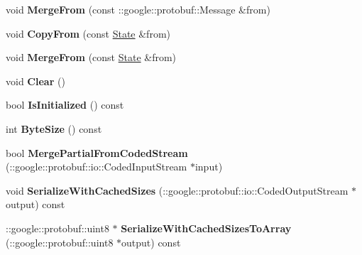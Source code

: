 \begin{DoxyCompactItemize}
\item 
\hypertarget{classgraph_1_1State_a3f0b1f20bac33c7254938c2e4dc44961}{
void {\bfseries MergeFrom} (const ::google::protobuf::Message \&from)}
\label{classgraph_1_1State_a3f0b1f20bac33c7254938c2e4dc44961}

\item 
\hypertarget{classgraph_1_1State_a2e62ade5c5af34b509befbbb2c36afd3}{
void {\bfseries CopyFrom} (const \hyperlink{classgraph_1_1State}{State} \&from)}
\label{classgraph_1_1State_a2e62ade5c5af34b509befbbb2c36afd3}

\item 
\hypertarget{classgraph_1_1State_a696753acbfc23dc59a3a4f47fd99b615}{
void {\bfseries MergeFrom} (const \hyperlink{classgraph_1_1State}{State} \&from)}
\label{classgraph_1_1State_a696753acbfc23dc59a3a4f47fd99b615}

\item 
\hypertarget{classgraph_1_1State_a20caa4e8b3584fb112bfc2b9a8e082ff}{
void {\bfseries Clear} ()}
\label{classgraph_1_1State_a20caa4e8b3584fb112bfc2b9a8e082ff}

\item 
\hypertarget{classgraph_1_1State_a01736d44a021a0bbc28676c35de6339d}{
bool {\bfseries IsInitialized} () const }
\label{classgraph_1_1State_a01736d44a021a0bbc28676c35de6339d}

\item 
\hypertarget{classgraph_1_1State_a89767644e0b92a1be04e504b35504bbc}{
int {\bfseries ByteSize} () const }
\label{classgraph_1_1State_a89767644e0b92a1be04e504b35504bbc}

\item 
\hypertarget{classgraph_1_1State_ae0c84f0786cb0690d7e473a718a3365d}{
bool {\bfseries MergePartialFromCodedStream} (::google::protobuf::io::CodedInputStream $\ast$input)}
\label{classgraph_1_1State_ae0c84f0786cb0690d7e473a718a3365d}

\item 
\hypertarget{classgraph_1_1State_a8261a94d9575d04e9dde511a2e1e16ce}{
void {\bfseries SerializeWithCachedSizes} (::google::protobuf::io::CodedOutputStream $\ast$output) const }
\label{classgraph_1_1State_a8261a94d9575d04e9dde511a2e1e16ce}

\item 
\hypertarget{classgraph_1_1State_a9311fff53a672da2c9709ad5f90ff092}{
::google::protobuf::uint8 $\ast$ {\bfseries SerializeWithCachedSizesToArray} (::google::protobuf::uint8 $\ast$output) const }
\label{classgraph_1_1State_a9311fff53a672da2c9709ad5f90ff092}


\end{DoxyCompactItemize}

